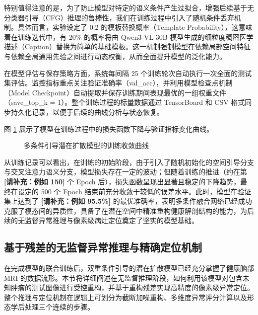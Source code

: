 \documentclass[Win]{xjtuBSThesis}  %
\begin{document}
特别值得注意的是，为了防止模型对特定的语义条件产生过拟合，增强后续基于无分类器引导（CFG）推理的鲁棒性，我们在训练过程中引入了随机条件丢弃机制。具体而言，实验设定了 0.2 的模板替换概率（Template Probability），这意味着在训练迭代中，有 20\% 的概率将由 Qwen3-VL-30B 模型生成的细粒度稠密医学描述（Caption）替换为简单的基础模板。这一机制强制模型在依赖局部空间特征与依赖全局通用先验之间进行动态权衡，从而全面提升模型的泛化能力。

在模型评估与保存策略方面，系统每间隔 25 个训练轮次自动执行一次全面的测试集评估。监控指标重点关注验证准确率（val\_acc），并利用模型检查点机制（Model Checkpoint）自动提取并保存训练期间表现最优的一组权重文件（save\_top\_k = 1）。整个训练过程的标量数据通过 TensorBoard 和 CSV 格式同步持久化记录，以便于后续的曲线分析与状态恢复。

图 \ref{fig:training_loss} 展示了模型在训练过程中的损失函数下降与验证指标变化曲线。

\begin{figure}[htbp]
    \centering
    \caption{多条件引导潜在扩散模型的训练收敛曲线}
    \label{fig:training_loss}
\end{figure}

从训练记录可以看出，在训练的初始阶段，由于引入了随机初始化的空间引导分支与交叉注意力语义分支，模型损失存在一定的波动；但随着训练的推进（约在第 \textbf{[请补充：例如 150]} 个 Epoch 后），损失函数呈现出显著且稳定的下降趋势，最终在设定的 500 个 Epoch 结束前充分收敛于较低的误差水平。此时，模型在验证集上达到了 \textbf{[请补充：例如 95.5\%]} 的最优准确率，表明多条件融合网络已经成功克服了模态间的异质性，具备了在潜在空间中精准重构健康解剖结构的能力，为后续的无监督异常推理与像素级病灶定位奠定了坚实的模型基础。

\subsection{基于残差的无监督异常推理与精确定位机制}
\label{subsec:anomaly_scoring}

在完成模型的联合训练后，双重条件引导的潜在扩散模型已经充分掌握了健康脑部 MRI 的数据流形。本节将详细阐述在无监督推理阶段，如何利用该模型对包含未知肿瘤的测试图像进行受控重构，并基于重构残差实现高精度的像素级异常定位。整个推理与定位机制在逻辑上可划分为截断加噪重构、多维度异常评分计算以及形态学后处理三个连续的步骤。
\end{document}
